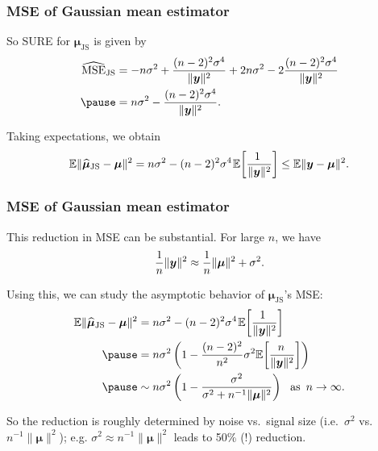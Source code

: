 \documentclass[18pt]{beamer}
\newcommand{\defineTightSpacing}{%
	\setlength{\abovedisplayskip}{.25\baselineskip}%
	\setlength{\belowdisplayskip}{.25\baselineskip}%
}
\renewcommand{\textsc}[1]{{\small \MakeUppercase{#1}}}
\newcommand{\thinnerspace}{\mskip.5\thinmuskip}
\newcommand{\expectation}{\mathbb{E}}
\newcommand{\by}{\bm{y}}
\newcommand{\bmu}{\bm{\mu}}
\begin{document}
\begin{frame}
\frametitle{M{\normalsize SE} of Gaussian mean estimator}
So \textsc{SURE} for $\widehat{\bmu}_{\mathrm{JS}}$ is given by
\begin{equation*} \defineTightSpacing%
\begin{aligned}
\widehat{\operatorname{MSE}}_{\mathrm{JS}}
	&= - n \sigma^2 
		+ \frac{(n - 2)^2 \sigma^4}{\| \by \|^2}
		+ 2 n \sigma^2 
		- 2 \frac{(n - 2)^2 \sigma^4}{\| \by \|^2} \\
	\pause%
	&= n \sigma^2 - \frac{(n - 2)^2 \sigma^4}{\| \by \|^2}.
\end{aligned}
\end{equation*}
\pause%

Taking expectations, we obtain
\begin{equation*} \defineTightSpacing%
\expectation \| \widehat{\bmu}_{\mathrm{JS}} - \bmu \|^2 
	= n \sigma^2  - (n - 2)^2 \sigma^4 \thinnerspace \expectation\!\left[ \frac{\!\!1}{\| \by \|^2} \right] 
	\leq \expectation \| \by - \bmu \|^2.
\end{equation*}
\end{frame}

\begin{frame}
\frametitle{M{\normalsize SE} of Gaussian mean estimator}
This reduction in \textsc{MSE} can be substantial.
\pause%
For large $n$, we have
\begin{equation*} \defineTightSpacing%
\frac{1}{n} \| \by \|^2 \approx \frac{1}{n} \| \bmu \|^2 + \sigma^2.
\end{equation*}

\pause%
Using this, we can study the asymptotic behavior of $\widehat{\bmu}_{\mathrm{JS}}$'s \textsc{MSE}:
\begin{equation*} \defineTightSpacing%
\begin{aligned}
\expectation \| \widehat{\bmu}_{\mathrm{JS}} - \bmu \|^2 
	&= n \sigma^2  - (n - 2)^2 \sigma^4 \thinnerspace \expectation\!\left[ \frac{\!\!1}{\| \by \|^2} \right] \\
	\pause%
	&= n \sigma^2 \left(
		1 - \frac{(n - 2)^2}{n^2} \sigma^2 \expectation\!\left[ \frac{\!n}{\| \by \|^2} \right] 
	\right) \\
	\pause%
	&\sim n \sigma^2 \left(
		1 - \frac{\sigma^2}{\sigma^2 + n^{-1} \| \bmu \|^2} 
	\right)
	\ \text{ as } \, n \to \infty.
\end{aligned}
\end{equation*}

\pause%
So the reduction is roughly determined by noise vs.\ signal size (i.e.\ $\sigma^2$ vs.\ $n^{-1} \| \bmu \|^2$);
e.g.  $\sigma^2 \approx n^{-1} \| \bmu \|^2$ leads to 50\% (!) reduction. 
\end{frame}
\end{document}
